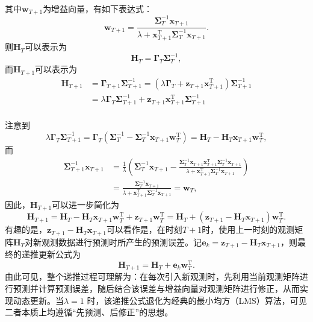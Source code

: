 其中\( \bm{w}_{T+1} \)为增益向量，有如下表达式：
\[
    \bm{w}_{T+1} = \frac{\mathbf{\Sigma}_T^{-1} \bm{x}_{T+1}}{\lambda + \bm{x}_{T+1}^\mathrm{T} \mathbf{\Sigma}_T^{-1} \bm{x}_{T+1}}.
\]
则\( \mathbf{H}_T \)可以表示为
\[
    \mathbf{H}_T = \mathbf{\Gamma}_T \mathbf{\Sigma}_T^{-1},
\]
而\( \mathbf{H}_{T+1} \)可以表示为
\[
    \begin{split}
        \mathbf{H}_{T+1} & = \mathbf{\Gamma}_{T+1} \mathbf{\Sigma}_{T+1}^{-1} = (\lambda \mathbf{\Gamma}_T + \bm{z}_{T+1}\bm{x}_{T+1}^\mathrm{T}) \mathbf{\Sigma}_{T+1}^{-1} \\
                         & = \lambda \mathbf{\Gamma}_T \mathbf{\Sigma}_{T+1}^{-1} + \bm{z}_{T+1}\bm{x}_{T+1}^\mathrm{T} \mathbf{\Sigma}_{T+1}^{-1}                           \\
    \end{split}
\]

注意到
\[
    \lambda \mathbf{\Gamma}_T \mathbf{\Sigma}_{T+1}^{-1} = \mathbf{\Gamma}_T \left(  \mathbf{\Sigma}_T^{-1} -  \mathbf{\Sigma}_{T}^{-1} \bm{x}_{T+1} \bm{w}_T^{\mathrm{T}} \right) = \mathbf{H}_T - \mathbf{H}_T \bm{x}_{T+1} \bm{w}_T^{\mathrm{T}},
\]
而
\[
    \begin{split}
        \mathbf{\Sigma}_{T + 1}^{-1} \bm{x}_{T+1} & = \frac{1}{\lambda} \left(  \mathbf{\Sigma}_T^{-1} \bm{x}_{T+1} - \frac{\mathbf{\Sigma}_{T}^{-1} \bm{x}_{T+1} \bm{x}_{T+1}^\mathrm{T} \mathbf{\Sigma}_{T}^{-1} \bm{x}_{T+1} }{\lambda + \bm{x}_{T+1}^\mathrm{T} \mathbf{\Sigma}_{T}^{-1} \bm{x}_{T+1}} \right) \\
                                                  & = \frac{ \mathbf{\Sigma}_T^{-1} \bm{x}_{T+1}}{\lambda + \bm{x}_{T+1}^\mathrm{T} \mathbf{\Sigma}_{T}^{-1} \bm{x}_{T+1}} = \bm{w}_T,
    \end{split}
\]
因此，\( \mathbf{H}_{T+1} \)可以进一步简化为
\[
    \mathbf{H}_{T+1} = \mathbf{H}_T - \mathbf{H}_T \bm{x}_{T+1} \bm{w}_T^{\mathrm{T}}  + \bm{z}_{T+1} \bm{w}_T^{\mathrm{T}} = \mathbf{H}_T + (\bm{z}_{T+1} - \mathbf{H}_T \bm{x}_{T+1}) \bm{w}_T^{\mathrm{T}}.
\]
有趣的是，\( \bm{z}_{T+1} - \mathbf{H}_T \bm{x}_{T+1} \)可以看作是，在时刻\( T + 1 \)时，使用上一时刻的观测矩阵\( \mathbf{H}_T \)对新观测数据进行预测时所产生的预测误差。记\( \bm{e}_k = \bm{z}_{T+1} - \mathbf{H}_T \bm{x}_{T+1} \)，则最终的递推更新公式为
\[
    \mathbf{H}_{T+1} = \mathbf{H}_T + \bm{e}_k \bm{w}_T^{\mathrm{T}}.
\]
由此可见，整个递推过程可理解为：在每次引入新观测时，先利用当前观测矩阵进行预测并计算预测误差，随后结合该误差与增益向量对观测矩阵进行修正，从而实现动态更新。当\(  \lambda = 1 \) 时，该递推公式退化为经典的最小均方（LMS）算法，可见二者本质上均遵循``先预测、后修正''的思想。

